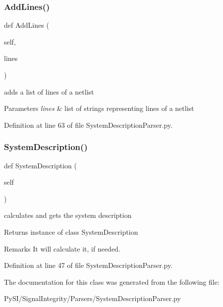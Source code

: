 \subsubsection{\texorpdfstring{Add\+Lines()}{AddLines()}}
{\footnotesize\ttfamily def Add\+Lines (\begin{DoxyParamCaption}\item[{}]{self,  }\item[{}]{lines }\end{DoxyParamCaption})}



adds a list of lines of a netlist 


\begin{DoxyParams}{Parameters}
{\em lines} & list of strings representing lines of a netlist \\
\hline
\end{DoxyParams}


Definition at line 63 of file System\+Description\+Parser.\+py.

\mbox{\label{classSignalIntegrity_1_1Parsers_1_1SystemDescriptionParser_1_1SystemDescriptionParser_acfebed448a60c7903add117ba0d3c162}} 
\subsubsection{\texorpdfstring{System\+Description()}{SystemDescription()}}
{\footnotesize\ttfamily def System\+Description (\begin{DoxyParamCaption}\item[{}]{self }\end{DoxyParamCaption})}



calculates and gets the system description 

\begin{DoxyReturn}{Returns}
instance of class System\+Description 
\end{DoxyReturn}
\begin{DoxyRemark}{Remarks}
It will calculate it, if needed. 
\end{DoxyRemark}


Definition at line 47 of file System\+Description\+Parser.\+py.



The documentation for this class was generated from the following file\+:\begin{DoxyCompactItemize}
\item 
Py\+S\+I/\+Signal\+Integrity/\+Parsers/System\+Description\+Parser.\+py\end{DoxyCompactItemize}
